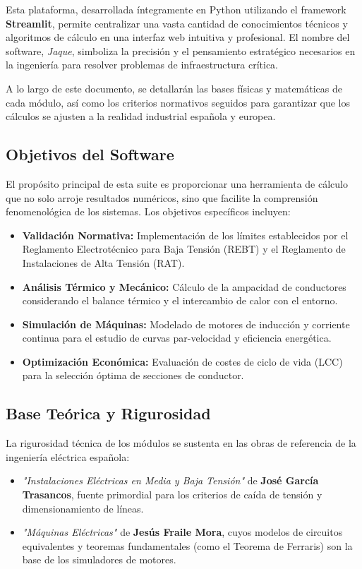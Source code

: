 \documentclass[11pt,a4paper]{article}
\begin{document}
Esta plataforma, desarrollada íntegramente en Python utilizando el framework \textbf{Streamlit}, permite centralizar una vasta cantidad de conocimientos técnicos y algoritmos de cálculo en una interfaz web intuitiva y profesional. El nombre del software, \textit{Jaque}, simboliza la precisión y el pensamiento estratégico necesarios en la ingeniería para resolver problemas de infraestructura crítica.

A lo largo de este documento, se detallarán las bases físicas y matemáticas de cada módulo, así como los criterios normativos seguidos para garantizar que los cálculos se ajusten a la realidad industrial española y europea.

\subsection{Objetivos del Software}
El propósito principal de esta suite es proporcionar una herramienta de cálculo que no solo arroje resultados numéricos, sino que facilite la comprensión fenomenológica de los sistemas. Los objetivos específicos incluyen:
\begin{itemize}
    \item \textbf{Validación Normativa:} Implementación de los límites establecidos por el Reglamento Electrotécnico para Baja Tensión (REBT) y el Reglamento de Instalaciones de Alta Tensión (RAT).
    \item \textbf{Análisis Térmico y Mecánico:} Cálculo de la ampacidad de conductores considerando el balance térmico y el intercambio de calor con el entorno.
    \item \textbf{Simulación de Máquinas:} Modelado de motores de inducción y corriente continua para el estudio de curvas par-velocidad y eficiencia energética.
    \item \textbf{Optimización Económica:} Evaluación de costes de ciclo de vida (LCC) para la selección óptima de secciones de conductor.
\end{itemize}

\subsection{Base Teórica y Rigurosidad}
La rigurosidad técnica de los módulos se sustenta en las obras de referencia de la ingeniería eléctrica española:
\begin{itemize}
    \item \textit{"Instalaciones Eléctricas en Media y Baja Tensión"} de \textbf{José García Trasancos}, fuente primordial para los criterios de caída de tensión y dimensionamiento de líneas.
    \item \textit{"Máquinas Eléctricas"} de \textbf{Jesús Fraile Mora}, cuyos modelos de circuitos equivalentes y teoremas fundamentales (como el Teorema de Ferraris) son la base de los simuladores de motores.
\end{itemize}
\end{document}
